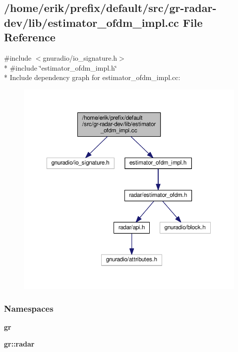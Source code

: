 \subsection{/home/erik/prefix/default/src/gr-\/radar-\/dev/lib/estimator\+\_\+ofdm\+\_\+impl.cc File Reference}
\label{estimator__ofdm__impl_8cc}
{\ttfamily \#include $<$gnuradio/io\+\_\+signature.\+h$>$}\\*
{\ttfamily \#include \char`\"{}estimator\+\_\+ofdm\+\_\+impl.\+h\char`\"{}}\\*
Include dependency graph for estimator\+\_\+ofdm\+\_\+impl.\+cc\+:
\nopagebreak
\begin{figure}[H]
\begin{center}
\leavevmode
\includegraphics[width=350pt]{df/dd5/estimator__ofdm__impl_8cc__incl}
\end{center}
\end{figure}
\subsubsection*{Namespaces}
\begin{DoxyCompactItemize}
\item 
 {\bf gr}
\item 
 {\bf gr\+::radar}
\end{DoxyCompactItemize}
